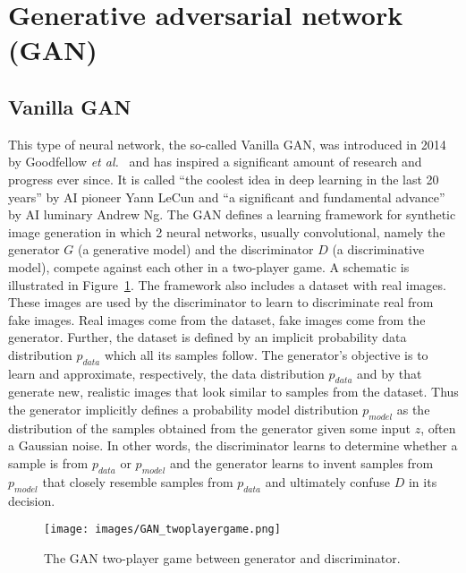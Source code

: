 \documentclass[a4paper,12pt]{report}
\begin{document}
\section{Generative adversarial network (GAN)}
\subsection{Vanilla GAN}\label{subsec:vanillaGan}
This type of neural network, the so-called Vanilla GAN, was introduced in 2014 by Goodfellow \textit{et al.}~\cite{1406.2661} and has inspired a significant amount of research and progress ever since. It is called ``the coolest idea in deep learning in the last 20 years'' by AI pioneer Yann LeCun and ``a significant and fundamental advance'' by AI luminary Andrew Ng. The GAN defines a learning framework for synthetic image generation in which 2 neural networks, usually convolutional, namely the generator $G$ (a generative model) and the discriminator $D$ (a discriminative model), compete against each other in a two-player game. A schematic is illustrated in Figure~\ref{fig:gan_learning}. The framework also includes a dataset with real images. These images are used by the discriminator to learn to discriminate real from fake images. Real images come from the dataset, fake images come from the generator. Further, the dataset is defined by an implicit probability data distribution $p_{data}$ which all its samples follow. The generator's objective is to learn and approximate, respectively, the data distribution $p_{data}$ and by that generate new, realistic images that look similar to samples from the dataset. Thus the generator implicitly defines a probability model distribution $p_{model}$ as the distribution of the samples obtained from the generator given some input $z$, often a Gaussian noise. In other words, the discriminator learns to determine whether a sample is from $p_{data}$ or $p_{model}$ and the generator learns to invent samples from $p_{model}$ that closely resemble samples from $p_{data}$ and ultimately confuse $D$ in its decision.  
\begin{figure}[ht]
\centering
\texttt{[image: images/GAN\_twoplayergame.png]}
\caption{The GAN two-player game between generator and discriminator.}
\label{fig:gan_learning}
\end{figure}
\end{document}
